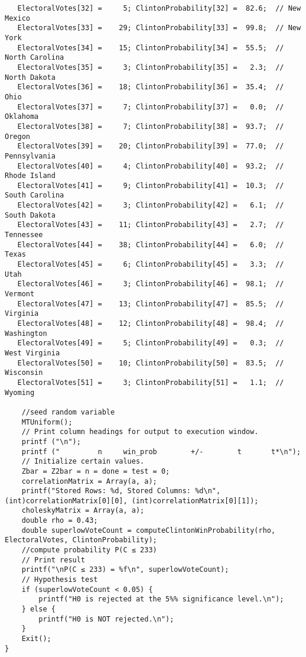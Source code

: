 \documentclass{report}
\begin{document}
\begin{lstlisting}
   ElectoralVotes[32] =     5; ClintonProbability[32] =  82.6;  // New Mexico
   ElectoralVotes[33] =    29; ClintonProbability[33] =  99.8;  // New York
   ElectoralVotes[34] =    15; ClintonProbability[34] =  55.5;  // North Carolina
   ElectoralVotes[35] =     3; ClintonProbability[35] =   2.3;  // North Dakota
   ElectoralVotes[36] =    18; ClintonProbability[36] =  35.4;  // Ohio
   ElectoralVotes[37] =     7; ClintonProbability[37] =   0.0;  // Oklahoma
   ElectoralVotes[38] =     7; ClintonProbability[38] =  93.7;  // Oregon
   ElectoralVotes[39] =    20; ClintonProbability[39] =  77.0;  // Pennsylvania
   ElectoralVotes[40] =     4; ClintonProbability[40] =  93.2;  // Rhode Island
   ElectoralVotes[41] =     9; ClintonProbability[41] =  10.3;  // South Carolina
   ElectoralVotes[42] =     3; ClintonProbability[42] =   6.1;  // South Dakota
   ElectoralVotes[43] =    11; ClintonProbability[43] =   2.7;  // Tennessee
   ElectoralVotes[44] =    38; ClintonProbability[44] =   6.0;  // Texas
   ElectoralVotes[45] =     6; ClintonProbability[45] =   3.3;  // Utah
   ElectoralVotes[46] =     3; ClintonProbability[46] =  98.1;  // Vermont
   ElectoralVotes[47] =    13; ClintonProbability[47] =  85.5;  // Virginia
   ElectoralVotes[48] =    12; ClintonProbability[48] =  98.4;  // Washington
   ElectoralVotes[49] =     5; ClintonProbability[49] =   0.3;  // West Virginia
   ElectoralVotes[50] =    10; ClintonProbability[50] =  83.5;  // Wisconsin
   ElectoralVotes[51] =     3; ClintonProbability[51] =   1.1;  // Wyoming

    //seed random variable
    MTUniform();
    // Print column headings for output to execution window.
    printf ("\n");
    printf ("         n     win_prob        +/-        t       t*\n");
    // Initialize certain values.
    Zbar = Z2bar = n = done = test = 0;
    correlationMatrix = Array(a, a);
    printf("Stored Rows: %d, Stored Columns: %d\n", (int)correlationMatrix[0][0], (int)correlationMatrix[0][1]);
    choleskyMatrix = Array(a, a);
    double rho = 0.43;
    double superlowVoteCount = computeClintonWinProbability(rho, ElectoralVotes, ClintonProbability);
    //compute probability P(C ≤ 233)
    // Print result
    printf("\nP(C ≤ 233) = %f\n", superlowVoteCount);
    // Hypothesis test
    if (superlowVoteCount < 0.05) {
        printf("H0 is rejected at the 5%% significance level.\n");
    } else {
        printf("H0 is NOT rejected.\n");
    }
    Exit();
}
\end{lstlisting}
\pagebreak
\end{document}
